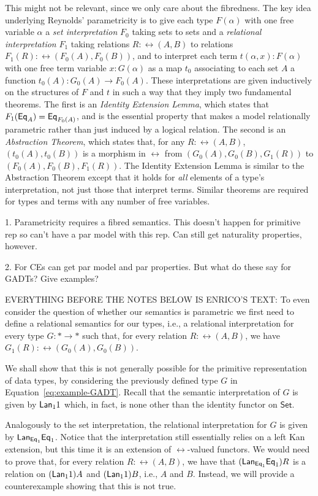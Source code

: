\documentclass[acmsmall,screen,review,anonymous]{acmart}
\theoremstyle{definition}
\newcommand{\set}{\mathsf{Set}}
\begin{document}
{\color{red} This might not be relevant, since we only care about the
  fibredness.} 
The key idea underlying Reynolds' parametricity is to give each type
$F(\alpha)$ with one free variable $\alpha$ a {\em set interpretation}
$F_0$ taking sets to sets and a \emph{relational interpretation} $F_1$
taking relations $R : \rel(A,B)$ to relations $F_1 (R) : \rel(F_0 (A),
F_0 (B))$, and to interpret each term $t(\alpha,x) : F(\alpha)$ with
one free term variable $x : G(\alpha)$ as a map $t_0$ associating to
each set $A$ a function $t_0(A) : G_0(A) \to F_0(A)$. These
interpretations are given inductively on the structures of $F$ and $t$
in such a way that they imply two fundamental theorems. The first is
an \emph{Identity Extension Lemma}, which states that $F_1(\mathsf{Eq}_A) =
\mathsf{Eq}_{F_0(A)}$, and is the essential property that makes a model
relationally parametric rather than just induced by a logical
relation. The second is an \emph{Abstraction Theorem}, which states
that, for any $R :\rel(A, B)$, $(t_0(A),t_0(B))$ is a morphism in
$\rel$ from $(G_0(A),G_0(B),G_1(R))$ to $(F_0(A),F_0(B),F_1(R))$. The
Identity Extension Lemma is similar to the Abstraction Theorem except
that it holds for {\em all} elements of a type's interpretation, not
just those that interpret terms.  Similar theorems are required for
types and terms with any number of free variables.

1. Parametricity requires a fibred semantics. This doesn't happen for
primitive rep so can't have a par model with this rep. Can still get
naturality properties, however.

2. For CEs can get par model and par properties. But what do these say
for GADTs? Give examples?

{\color{red} EVERYTHING BEFORE THE NOTES BELOW IS ENRICO'S TEXT:} To
even consider the question of whether our semantics is parametric we
first need to define a relational semantics for our types, i.e., a
relational interpretation for every type $G : \ast \to \ast$ such
that, for every relation $R : \rel(A, B)$, we have $G_1(R) :
\rel(G_0(A), G_0(B))$.

We shall show that this is not generally possible for the primitive
representation of data types, by considering the previously defined
type $G$ in Equation~\ref{eq:example-GADT}.  Recall that the semantic
interpretation of $G$ is given by $\mathsf{\mathsf{Lan}}_1 1$ which, in fact,
is none other than the identity functor on $\set$.

Analogously to the set interpretation, the relational interpretation
for $G$ is given by $\mathsf{\mathsf{Lan}}_{\mathsf{Eq}_1} \mathsf{Eq}_1$.  Notice that the
interpretation still essentially relies on a left Kan extension, but
this time it is an extension of $\rel$-valued functors.  We would need
to prove that, for every relation $R : \rel(A, B)$, we have that
$(\mathsf{\mathsf{Lan}}_{\mathsf{Eq}_1} \mathsf{Eq}_1) R$ is a relation on $(\mathsf{\mathsf{Lan}}_1
1) A$ and $(\mathsf{\mathsf{Lan}}_1 1)B$, i.e., $A$ and $B$.  Instead, we will
provide a counterexample showing that this is not true.
\end{document}
